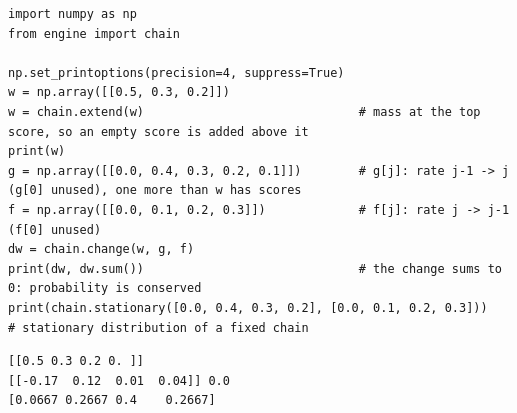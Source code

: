 \begin{lstlisting}[style=code]
import numpy as np
from engine import chain

np.set_printoptions(precision=4, suppress=True)
w = np.array([[0.5, 0.3, 0.2]])
w = chain.extend(w)                              # mass at the top score, so an empty score is added above it
print(w)
g = np.array([[0.0, 0.4, 0.3, 0.2, 0.1]])        # g[j]: rate j-1 -> j (g[0] unused), one more than w has scores
f = np.array([[0.0, 0.1, 0.2, 0.3]])             # f[j]: rate j -> j-1 (f[0] unused)
dw = chain.change(w, g, f)
print(dw, dw.sum())                              # the change sums to 0: probability is conserved
print(chain.stationary([0.0, 0.4, 0.3, 0.2], [0.0, 0.1, 0.2, 0.3]))   # stationary distribution of a fixed chain
\end{lstlisting}
\begin{lstlisting}[style=output]
[[0.5 0.3 0.2 0. ]]
[[-0.17  0.12  0.01  0.04]] 0.0
[0.0667 0.2667 0.4    0.2667]
\end{lstlisting}
